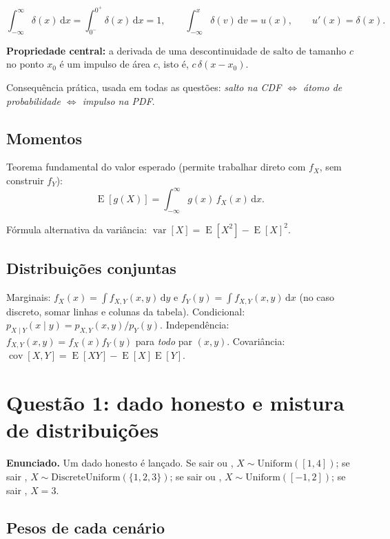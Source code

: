 \documentclass[11pt,a4paper]{article}
\newcommand{\dd}{\,\mathrm{d}}
\DeclareMathOperator{\E}{E}
\DeclareMathOperator{\var}{var}
\DeclareMathOperator{\cov}{cov}
\begin{document}
\[
\int_{-\infty}^{\infty}\!\!\delta(x)\dd x = \int_{0^-}^{0^+}\!\!\delta(x)\dd x = 1,
\qquad
\int_{-\infty}^{x}\!\!\delta(v)\dd v = u(x),
\qquad
u'(x) = \delta(x).
\]

\begin{resp}
\textbf{Propriedade central:} a derivada de uma descontinuidade de salto de
tamanho $c$ no ponto $x_0$ é um impulso de área $c$, isto é, $c\,\delta(x-x_0)$.
\end{resp}

Consequência prática, usada em todas as questões: \emph{salto na CDF $\Leftrightarrow$
átomo de probabilidade $\Leftrightarrow$ impulso na PDF}.

\subsection*{Momentos}

Teorema fundamental do valor esperado (permite trabalhar direto com $f_X$, sem
construir $f_Y$):
\[
\E[g(X)] = \int_{-\infty}^{\infty} g(x)\,f_X(x)\dd x .
\]

Fórmula alternativa da variância: $\var[X] = \E[X^2] - \E[X]^2$.

\subsection*{Distribuições conjuntas}

Marginais: $f_X(x)=\int f_{X,Y}(x,y)\dd y$ e $f_Y(y)=\int f_{X,Y}(x,y)\dd x$
(no caso discreto, somar linhas e colunas da tabela).
Condicional: $p_{X\mid Y}(x\mid y) = p_{X,Y}(x,y)/p_Y(y)$.
Independência: $f_{X,Y}(x,y)=f_X(x)f_Y(y)$ para \emph{todo} par $(x,y)$.
Covariância: $\cov[X,Y]=\E[XY]-\E[X]\E[Y]$.

\clearpage
\section{Questão 1: dado honesto e mistura de distribuições}

\textbf{Enunciado.} Um dado honesto é lançado. Se sair  ou ,
$X\sim\text{Uniform}([1,4])$; se sair , $X\sim\text{DiscreteUniform}(\{1,2,3\})$;
se sair  ou , $X\sim\text{Uniform}([-1,2])$; se sair , $X=3$.

\subsection*{Pesos de cada cenário}
\end{document}
